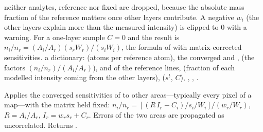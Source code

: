 neither analytes, reference nor fixed are dropped, because the absolute mass fraction of the
reference matters once other layers contribute. A negative $w_i$ (the other layers explain
more than the measured intensity) is clipped to 0 with a warning. For a one-layer sample
$C=0$ and the result is $n_i/n_r = (A_i/A_r)(s_r W_r)/(s_i W_i)$, the formula of
 with matrix-corrected sensitivities.
 a dictionary:  (atoms per reference atom), the converged
 and ,  (the factors $(n_i/n_r)/(A_i/A_r)$),  and
 of the reference lines,  (fraction of each modelled
intensity coming from the other layers),  ($s^t$, $C$), ,
, .

Applies the converged sensitivities of  to other areas---typically every
pixel of a map---with the matrix held fixed:
$n_i/n_r = [(R\,I_r - C_i)/s_i/W_i]/(w_r/W_r)$, $R = A_i/A_r$, $I_r = w_r s_r + C_r$. Errors of
the two areas are propagated as uncorrelated. Returns .
